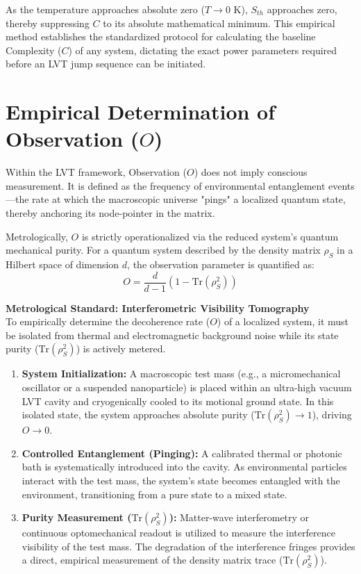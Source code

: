 \documentclass[12pt,a4paper]{article}
\begin{document}
As the temperature approaches absolute zero ($T \to 0$ K), $S_{th}$ approaches zero, thereby suppressing $C$ to its absolute mathematical minimum. This empirical method establishes the standardized protocol for calculating the baseline Complexity ($C$) of any system, dictating the exact power parameters required before an LVT jump sequence can be initiated.


\section{Empirical Determination of Observation ($O$)}
Within the LVT framework, Observation ($O$) does not imply conscious measurement. It is defined as the frequency of environmental entanglement events—the rate at which the macroscopic universe "pings" a localized quantum state, thereby anchoring its node-pointer in the matrix. 

Metrologically, $O$ is strictly operationalized via the reduced system's quantum mechanical purity. For a quantum system described by the density matrix $\rho_S$ in a Hilbert space of dimension $d$, the observation parameter is quantified as:
\begin{equation}\label{eq:O_decoherence}
O = \frac{d}{d-1} \left( 1 - \text{Tr}(\rho_S^2) \right)
\end{equation}

\textbf{Metrological Standard: Interferometric Visibility Tomography} \\
To empirically determine the decoherence rate ($O$) of a localized system, it must be isolated from thermal and electromagnetic background noise while its state purity ($\text{Tr}(\rho_S^2)$) is actively metered.

\begin{enumerate}
    \item \textbf{System Initialization:} A macroscopic test mass (e.g., a micromechanical oscillator or a suspended nanoparticle) is placed within an ultra-high vacuum LVT cavity and cryogenically cooled to its motional ground state. In this isolated state, the system approaches absolute purity ($\text{Tr}(\rho_S^2) \to 1$), driving $O \to 0$.
    \item \textbf{Controlled Entanglement (Pinging):} A calibrated thermal or photonic bath is systematically introduced into the cavity. As environmental particles interact with the test mass, the system's state becomes entangled with the environment, transitioning from a pure state to a mixed state.
    \item \textbf{Purity Measurement ($\text{Tr}(\rho_S^2)$):} Matter-wave interferometry or continuous optomechanical readout is utilized to measure the interference visibility of the test mass. The degradation of the interference fringes provides a direct, empirical measurement of the density matrix trace ($\text{Tr}(\rho_S^2)$).
\end{enumerate}
\end{document}
